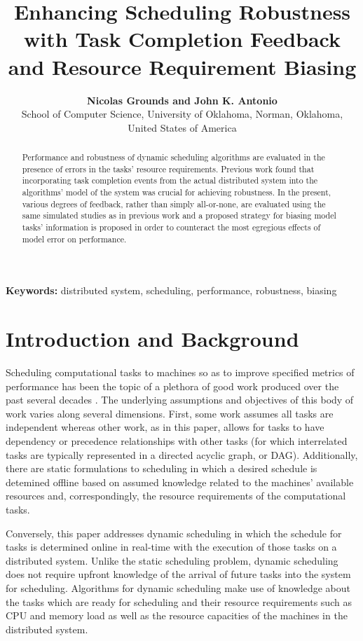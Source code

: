 \documentclass[10pt]{csce}
\title{\bf Enhancing Scheduling Robustness with Task Completion Feedback and
Resource Requirement Biasing}
\author{
{\bfseries Nicolas Grounds and John K. Antonio}\\
School of Computer Science, University of Oklahoma, Norman, Oklahoma, United States of America\\
}
\begin{document}
\maketitle                        %

\begin{abstract}
Performance and robustness of dynamic scheduling algorithms are evaluated in
the presence of errors in the tasks' resource requirements.  Previous work
found that incorporating task completion events from the actual distributed
system into the algorithms' model of the system was crucial for achieving
robustness.  In the present, various degrees of feedback, rather than simply
all-or-none, are evaluated using the same simulated studies as in previous
work and a proposed strategy for biasing model tasks' information is proposed
in order to counteract the most egregious effects of model error on
performance.
\end{abstract}


\vspace{1em}
\noindent\textbf{Keywords:}
 {\small distributed system, scheduling, performance, robustness, biasing}


\section{Introduction and Background}
\label{sec:Intro}

Scheduling computational tasks to machines so as to improve specified metrics
of performance has been the topic of a plethora of good work produced over the
past several decades \cite{taxonomy}. The underlying assumptions and objectives
of this body of work varies along several dimensions. First, some work assumes
all tasks are independent whereas other work, as in this paper, allows for
tasks to have dependency or precedence relationships with other tasks (for
which interrelated tasks are typically represented in a directed acyclic graph,
or DAG). Additionally, there are static formulations to scheduling in which a
desired schedule is detemined offline based on assumed knowledge related to the
machines' available resources and, correspondingly, the resource requirements
of the computational tasks.

Conversely, this paper addresses dynamic scheduling in which the schedule for
tasks is determined online in real-time with the execution of those tasks on a
distributed system. Unlike the static scheduling problem, dynamic scheduling
does not require upfront knowledge of the arrival of future tasks into the
system for scheduling. Algorithms for dynamic scheduling make use of knowledge
about the tasks which are ready for scheduling and their resource requirements
such as CPU and memory load as well as the resource capacities of the machines
in the distributed system.
\end{document}
